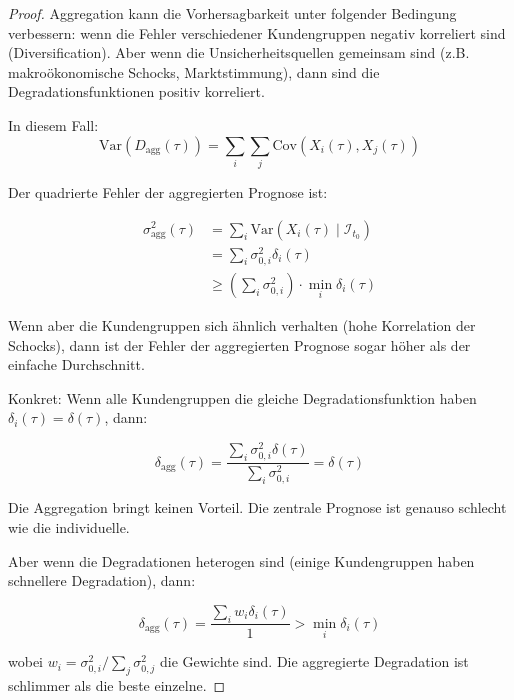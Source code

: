 \documentclass[a4paper, 12pt, twoside, openright]{report}
\theoremstyle{definition}
\theoremstyle{definition}
\newcommand{\Var}{\mathrm{Var}}
\newcommand{\Cov}{\mathrm{Cov}}
\begin{document}
\begin{proof}
Aggregation kann die Vorhersagbarkeit unter folgender Bedingung verbessern: wenn die Fehler verschiedener Kundengruppen negativ korreliert sind (Diversification). Aber wenn die Unsicherheitsquellen gemeinsam sind (z.B. makroökonomische Schocks, Marktstimmung), dann sind die Degradationsfunktionen positiv korreliert.

In diesem Fall:
\begin{equation}
\Var(D_{\text{agg}}(\tau)) = \sum_i \sum_j \Cov(X_i(\tau), X_j(\tau))
\end{equation}

Der quadrierte Fehler der aggregierten Prognose ist:

\begin{align}
\sigma_{\text{agg}}^2(\tau) &= \sum_i \Var(X_i(\tau) \mid \mathcal{I}_{t_0}) \\
&= \sum_i \sigma_{0,i}^2 \delta_i(\tau) \\
&\geq \left(\sum_i \sigma_{0,i}^2\right) \cdot \min_i \delta_i(\tau)
\end{align}

Wenn aber die Kundengruppen sich ähnlich verhalten (hohe Korrelation der Schocks), dann ist der Fehler der aggregierten Prognose sogar höher als der einfache Durchschnitt.

Konkret: Wenn alle Kundengruppen die gleiche Degradationsfunktion haben $\delta_i(\tau) = \delta(\tau)$, dann:

\begin{equation}
\delta_{\text{agg}}(\tau) = \frac{\sum_i \sigma_{0,i}^2 \delta(\tau)}{\sum_i \sigma_{0,i}^2} = \delta(\tau)
\end{equation}

Die Aggregation bringt keinen Vorteil. Die zentrale Prognose ist genauso schlecht wie die individuelle.

Aber wenn die Degradationen heterogen sind (einige Kundengruppen haben schnellere Degradation), dann:

\begin{equation}
\delta_{\text{agg}}(\tau) = \frac{\sum_i w_i \delta_i(\tau)}{1} > \min_i \delta_i(\tau)
\end{equation}

wobei $w_i = \sigma_{0,i}^2 / \sum_j \sigma_{0,j}^2$ die Gewichte sind. Die aggregierte Degradation ist schlimmer als die beste einzelne.
\end{proof}
\end{document}
